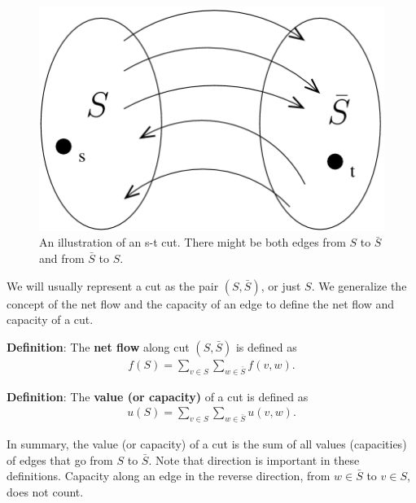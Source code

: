 \documentclass{article}
\begin{document}
\begin{figure}[h]
\begin{center}
  \includegraphics{ex_cut1.png}
  \caption{An illustration of an s-t cut.  There might be both edges from $S$ to $\bar{S}$ and
  from $\bar{S}$ to $S$.}
\label{fig:ex_cut1}
\end{center}
\end{figure}


We will usually represent a cut as the pair $(S, \bar{S})$, or
just $S$.  We generalize the concept of the net flow and the
capacity of an edge to define the net flow and capacity of a cut.


\textbf{Definition}:
The \textbf{net flow} along cut $(S, \bar{S})$ is defined as
\begin{align*}
  f(S)=\sum_{v\in S}\sum_{w\in \bar{S}} f(v,w).
\end{align*}


\textbf{Definition}:
The \textbf{value (or capacity)} of a cut is defined as
\begin{align*}
  u(S)=\sum_{v\in S}\sum_{w\in \bar{S}} u(v,w).
\end{align*}

In summary, the value (or capacity) of a cut is the sum of all values (capacities) of edges that go from $S$ to $\bar{S}$.  Note that direction is important in these definitions.  Capacity along an edge in the reverse direction, from $w \in \bar{S}$ to $v \in S$, does not count. 
\end{document}
